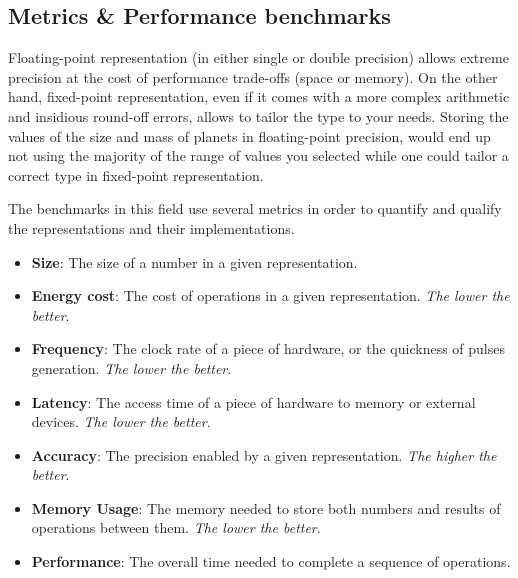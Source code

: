 \subsection{Metrics \& Performance benchmarks}

Floating-point representation (in either single or double precision) allows extreme precision at the cost of performance trade-offs (space or memory). On the other hand, fixed-point representation, even if it comes with a more complex arithmetic and insidious round-off errors, allows to tailor the type to your needs. Storing the values of the size and mass of planets in floating-point precision, would end up not using the majority of the range of values you selected while one could tailor a correct type in fixed-point representation.

The benchmarks in this field use several metrics in order to quantify and qualify the representations and their implementations.
\begin{itemize}
	\item \textbf{Size}: The size of a number in a given representation.
	\item \textbf{Energy cost}: The cost of operations in a given representation. \emph{The lower the better}.
	\item \textbf{Frequency}: The clock rate of a piece of hardware, or the quickness of pulses generation. \emph{The lower the better}.
	\item \textbf{Latency}: The access time of a piece of hardware to memory or external devices. \emph{The lower the better}.
	\item \textbf{Accuracy}: The precision enabled by a given representation. \emph{The higher the better}.
	\item \textbf{Memory Usage}: The memory needed to store both numbers and results of operations between them. \emph{The lower the better}.
	\item \textbf{Performance}: The overall time needed to complete a sequence of operations.
\end{itemize}

